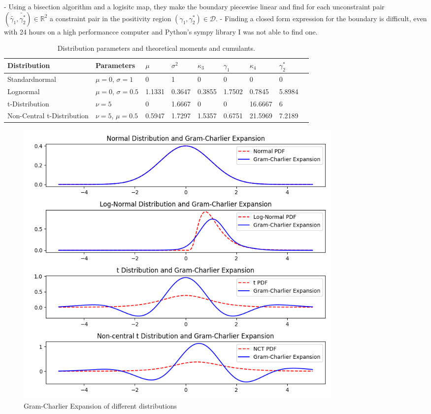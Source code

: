 - Using a bisection algorithm and a logisitc map, they make the boundary piecewise linear and find for each unconstraint pair $(\tilde{\gamma_1}, \tilde{\gamma_2^*})\in\mathbb{R}^2$ a constraint pair in the positivity region $(\gamma_1, \gamma_2^*)\in \mathcal{D}$.
- Finding a closed form expression for the boundary is difficult, even with 24 hours on a high performancce computer and Python's sympy library I was not able to find one.

\begin{table}[h]
    \centering
    \begin{tabular}{l|l|l|l|l|l|l|l|l}
        Distribution & Parameters & $\mu$ & $\sigma^2$ & $\kappa_3$ & $\gamma_1$ & $\kappa_4$ & $\gamma_2^*$ \\
        \hline
        Standardnormal & $\mu=0$, $\sigma=1$ & 0 & 1 & 0 & 0 & 0 & 0 \\
        Lognormal & $\mu=0$, $\sigma = 0.5$ & 1.1331 & 0.3647 & 0.3855 & 1.7502 & 0.7845 & 5.8984 \\
        t-Distribution & $\nu=5$ & 0 & 1.6667 & 0 & 0 & 16.6667 & 6 \\
        Non-Central t-Distribution & $\nu=5$, $\mu=0.5$ & 0.5947 & 1.7297 & 1.5357 & 0.6751 & 21.5969 & 7.2189
    \end{tabular}
    \caption{Distribution parameters and theoretical moments and cumulants.}
    \label{table:distributions_theoretical_moments}
\end{table}

\begin{figure}[h]
    \centering
    \includegraphics[width=0.8\textwidth]{img/gc_expansion.png}
    \caption{Gram-Charlier Expansion of different distributions}
    \label{fig:gc_expansion}
\end{figure}

